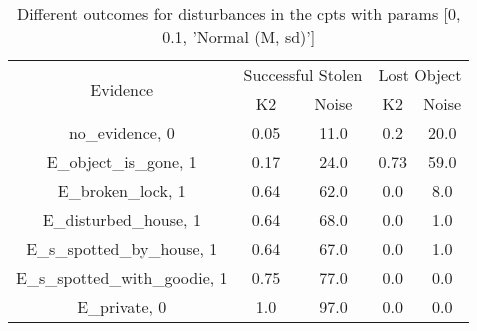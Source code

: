 \begin{table}\begin{tabular}{c|cc|cc}\toprule\multirow{2}{*}{Evidence} & \multicolumn{2}{c}{Successful Stolen} & \multicolumn{2}{c}{Lost Object} \\& {K2} & {Noise} & {K2} & {Noise} \\\midrule
no\_evidence, 0 & \cellcolor{Bittersweet}0.05&\cellcolor{Bittersweet}11.0&0.2&20.0\\E\_object\_is\_gone, 1 & \cellcolor{Bittersweet}0.17&\cellcolor{Bittersweet}24.0&\cellcolor{Bittersweet}0.73&\cellcolor{Bittersweet}59.0\\E\_broken\_lock, 1 & 0.64&62.0&\cellcolor{Bittersweet}0.0&\cellcolor{Bittersweet}8.0\\E\_disturbed\_house, 1 & 0.64&68.0&0.0&1.0\\E\_s\_spotted\_by\_house, 1 & 0.64&67.0&0.0&1.0\\E\_s\_spotted\_with\_goodie, 1 & 0.75&77.0&0.0&0.0\\E\_private, 0 & 1.0&97.0&0.0&0.0\\\bottomrule\end{tabular}\caption{Different outcomes for disturbances in the cpts with params [0, 0.1, 'Normal (M, sd)']}\end{table}